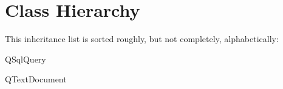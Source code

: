 \section{Class Hierarchy}
This inheritance list is sorted roughly, but not completely, alphabetically\+:\begin{DoxyCompactList}
\item {}
\begin{DoxyCompactList}
\item {}
\end{DoxyCompactList}
\item {}
\item {}
\item Q\+Sql\+Query\begin{DoxyCompactList}
\item {}
\end{DoxyCompactList}
\item Q\+Text\+Document\begin{DoxyCompactList}
\item {}
\end{DoxyCompactList}
\end{DoxyCompactList}
